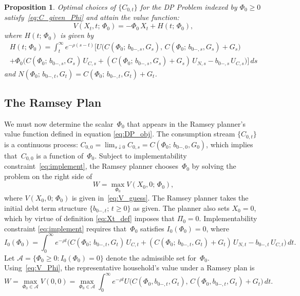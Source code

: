 \documentclass[12pt]{article}
\newtheorem{proposition}{Proposition}
\begin{document}
{\begin{proposition}\label{prop:DP_solution}
	Optimal choices of $\{C_{0,t}\}$ for the DP Problem indexed by $\Phi_0 \ge 0$ satisfy~\eqref{eq:C_given_Phi} and attain the value function:
	\begin{equation}\label{eq:V_Phi}
	V(X_t,t;\, \Phi_0) = -\Phi_0\, X_t + H(t;\, \Phi_0),
	\end{equation}
	where $H(t;\, \Phi_0)$ is given by
	\begin{multline}\label{eq:H_formula}
	H(t;\, \Phi_0) = \int_t^\infty e^{-\rho(s-t)}\biggl[U\bigl(C(\Phi_0;\, b_{0-,s}, G_s),\, C(\Phi_0;\, b_{0-,s}, G_s)+G_s\bigr) \\
	+ \Phi_0\bigl(C(\Phi_0;\, b_{0-,s}, G_s)\, U_{C,s} + (C(\Phi_0;\, b_{0-,s}, G_s)+G_s)\, U_{N,s} - b_{0-,s}\, U_{C,s}\bigr)\biggr]\, ds
	\end{multline}
	and $N(\Phi_0;\, b_{0-,t}, G_t) = C(\Phi_0;\, b_{0-,t}, G_t) + G_t$.
\end{proposition}




\subsection{The Ramsey Plan}\label{subsec:characterize}
We must now determine  the scalar~$\Phi_0$ that appears in  the Ramsey planner's value function defined in equation \eqref{eq:DP_obj}.
The consumption stream $\{C_{0,t}\}$ is a continuous process: $C_{0,0} = \lim_{s \downarrow 0} C_{0,s} = C(\Phi_0;\, b_{0-,0}, G_0)$, which implies that~$C_{0,0}$ is a function of~$\Phi_0$. Subject to implementability constraint~\eqref{eq:implement}, the Ramsey planner chooses~$\Phi_0$ by solving the problem 
on the right side of %
\begin{equation}\label{eq:Ramsey_choose_Phi}
W = \max_{\Phi_0} V(X_0, 0;\, \Phi_0),
\end{equation}
where $V(X_0, 0;\, \Phi_0)$ is given in~\eqref{eq:V_guess}. %
The Ramsey planner takes the initial debt term structure $\{b_{0-,t};\, t \ge 0\}$   as given. The planner also sets  $X_0 = 0$, which by virtue of definition
\eqref{eq:Xt_def} imposes that  $\Pi_0 = 0$. Implementability constraint \eqref{eq:implement}
requires that~$\Phi_0$ satisfies $I_0(\Phi_0) = 0$, where
\begin{equation}\label{eq:I0}
I_0(\Phi_0) = \int_0^\infty e^{-\rho t}\bigl(C(\Phi_0;\, b_{0-,t}, G_t)\, U_{C,t} + (C(\Phi_0;\, b_{0-,t}, G_t)+G_t)\, U_{N,t} - b_{0-,t}\, U_{C,t}\bigr)\, dt.
\end{equation}
Let $\mathcal{A} = \{\Phi_0 \ge 0 : I_0(\Phi_0) = 0\}$ denote the admissible set for~$\Phi_0$. Using~\eqref{eq:V_Phi}, the representative household's value under a  Ramsey plan is %
\[
W = \max_{\Phi_0 \in \mathcal{A}} V(0,0) = \max_{\Phi_0 \in \mathcal{A}} \int_0^\infty e^{-\rho t} U\bigl(C(\Phi_0, b_{0-,t}, G_t),\, C(\Phi_0, b_{0-,t}, G_t)+G_t\bigr)\, dt.
\]

}
\end{document}
